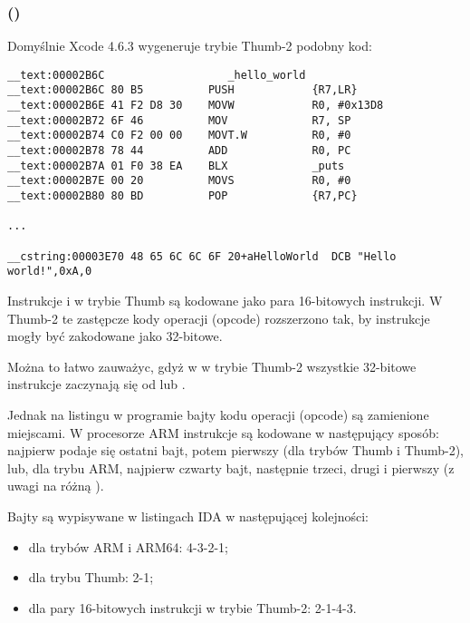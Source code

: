 \subsubsection{\OptimizingXcodeIV (\ThumbTwoMode)}

Domyślnie Xcode 4.6.3 wygeneruje trybie Thumb-2 podobny kod:

\begin{lstlisting}[caption=\OptimizingXcodeIV (\ThumbTwoMode),style=customasmARM]
__text:00002B6C                   _hello_world
__text:00002B6C 80 B5          PUSH            {R7,LR}
__text:00002B6E 41 F2 D8 30    MOVW            R0, #0x13D8
__text:00002B72 6F 46          MOV             R7, SP
__text:00002B74 C0 F2 00 00    MOVT.W          R0, #0
__text:00002B78 78 44          ADD             R0, PC
__text:00002B7A 01 F0 38 EA    BLX             _puts
__text:00002B7E 00 20          MOVS            R0, #0
__text:00002B80 80 BD          POP             {R7,PC}

...

__cstring:00003E70 48 65 6C 6C 6F 20+aHelloWorld  DCB "Hello world!",0xA,0
\end{lstlisting}


\myindex{\ThumbTwoMode}
Instrukcje  i  w trybie Thumb są kodowane jako para 16-bitowych instrukcji.
W Thumb-2 te zastępcze kody operacji (opcode) rozszerzono tak, by instrukcje mogły być zakodowane jako 32-bitowe.

Można to łatwo zauważyc, gdyż w w trybie Thumb-2 wszystkie 32-bitowe instrukcje zaczynają się od  lub .

Jednak na listingu w programie \IDA bajty kodu operacji (opcode) są zamienione miejscami.
W procesorze ARM instrukcje są kodowane w następujący sposób:
najpierw podaje się ostatni bajt, potem pierwszy (dla trybów Thumb i Thumb-2), lub, dla trybu ARM, najpierw czwarty bajt, następnie trzeci, drugi i pierwszy
(z uwagi na różną ).

Bajty są wypisywane w listingach IDA w następującej kolejności:

\begin{itemize}
\item dla trybów ARM i ARM64: 4-3-2-1;
\item dla trybu Thumb: 2-1;
\item dla pary 16-bitowych instrukcji w trybie Thumb-2: 2-1-4-3.
\end{itemize}

